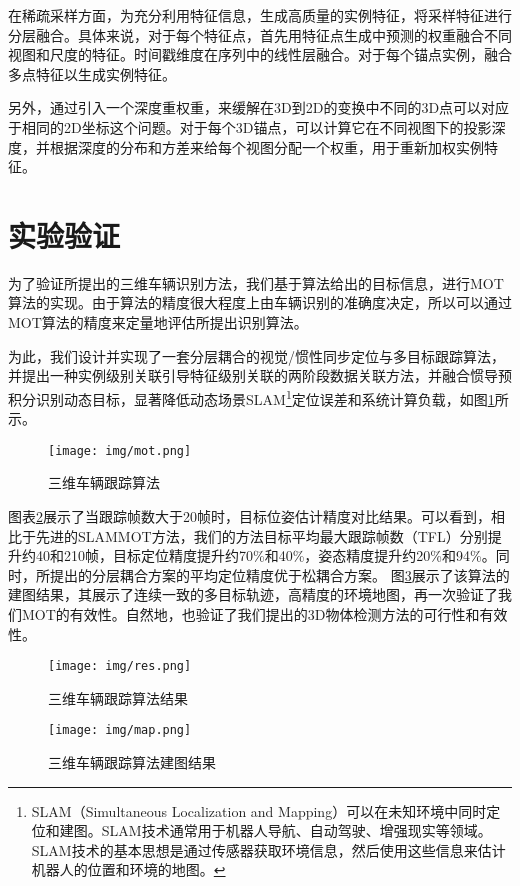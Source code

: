 \documentclass[12pt, twocolumn]{article}
\newcommand\normf{\fangsong}
\begin{document}
	在稀疏采样方面，为充分利用特征信息，生成高质量的实例特征，将采样特征进行分层融合。具体来说，对于每个特征点，首先用特征点生成中预测的权重融合不同视图和尺度的特征。时间戳维度在序列中的线性层融合。对于每个锚点实例，融合多点特征以生成实例特征。

	另外，通过引入一个深度重权重，来缓解在3D到2D的变换中不同的3D点可以对应于相同的2D坐标这个问题。对于每个3D锚点，可以计算它在不同视图下的投影深度，并根据深度的分布和方差来给每个视图分配一个权重，用于重新加权实例特征。
	
	\section{\normf 实验验证}
	为了验证所提出的三维车辆识别方法，我们基于算法给出的目标信息，进行MOT算法的实现。由于算法的精度很大程度上由车辆识别的准确度决定，所以可以通过MOT算法的精度来定量地评估所提出识别算法。
	
	为此，我们设计并实现了一套分层耦合的视觉/惯性同步定位与多目标跟踪算法，并提出一种实例级别关联引导特征级别关联的两阶段数据关联方法，并融合惯导预积分识别动态目标，显著降低动态场景SLAM\footnote{\normf SLAM（Simultaneous Localization and Mapping）可以在未知环境中同时定位和建图。SLAM技术通常用于机器人导航、自动驾驶、增强现实等领域。SLAM技术的基本思想是通过传感器获取环境信息，然后使用这些信息来估计机器人的位置和环境的地图。}定位误差和系统计算负载，如图\ref{fig:三维车辆跟踪算法}所示。
	\begin{figure}[h]
		\centering
		\texttt{[image: img/mot.png]}
		\caption{\normf 三维车辆跟踪算法}
		\label{fig:三维车辆跟踪算法}
	\end{figure}
	
	图表\ref{fig:三维车辆跟踪算法结果}展示了当跟踪帧数大于20帧时，目标位姿估计精度对比结果。可以看到，相比于先进的SLAMMOT方法，我们的方法目标平均最大跟踪帧数（TFL）分别提升约40和210帧，目标定位精度提升约70\%和40\%，姿态精度提升约20\%和94\%。同时，所提出的分层耦合方案的平均定位精度优于松耦合方案。
	图\ref{fig:三维车辆跟踪算法建图结果}展示了该算法的建图结果，其展示了连续一致的多目标轨迹，高精度的环境地图，再一次验证了我们MOT的有效性。自然地，也验证了我们提出的3D物体检测方法的可行性和有效性。

	\begin{figure}[h]
		\centering
		\texttt{[image: img/res.png]}
		\caption{\normf 三维车辆跟踪算法结果}
		\label{fig:三维车辆跟踪算法结果}
	\end{figure}
	
		\begin{figure}[h]
			\centering
			\texttt{[image: img/map.png]}
			\caption{\normf 三维车辆跟踪算法建图结果}
			\label{fig:三维车辆跟踪算法建图结果}
		\end{figure}
\end{document}
